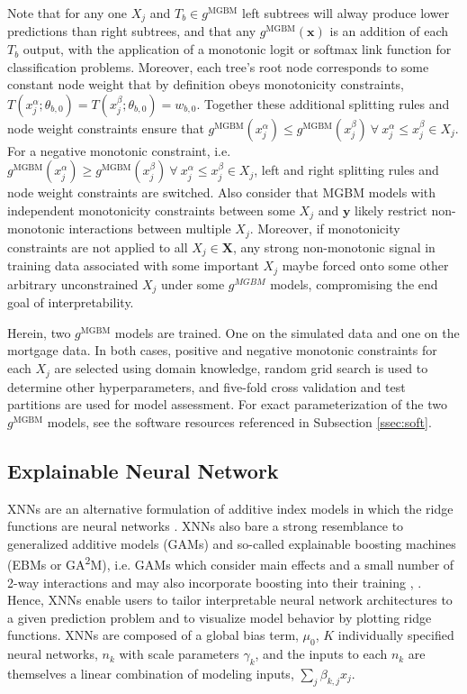 \documentclass[information,article,submit,moreauthors,pdftex]{definitions/mdpi}
\begin{document}
\noindent Note that for any one $X_j$ and $T_b \in g^{\text{MGBM}}$ left subtrees will alway produce lower predictions than right subtrees, and that any $g^{\text{MGBM}}(\mathbf{x})$ is an addition of each $T_b$ output, with the application of a monotonic logit or softmax link function for classification problems. Moreover, each tree's root node corresponds to some constant node weight that by definition obeys monotonicity constraints, $ T(x^{\alpha}_j; \theta_{b,0}) = T(x^{\beta}_j; \theta_{b,0}) = w_{b,0}$. Together these additional splitting rules and node weight constraints ensure that $g^{\text{MGBM}}(x^{\alpha}_j)  \le g^{\text{MGBM}}(x^{\beta}_j) ~\forall ~x^{\alpha}_j \le x^{\beta}_j \in X_j$. For a negative monotonic constraint, i.e. $g^{\text{MGBM}}(x^{\alpha}_j)  \ge g^{\text{MGBM}}(x^{\beta}_j) ~\forall ~x^{\alpha}_j \le x^{\beta}_j \in X_j$, left and right splitting rules and node weight constraints are switched. Also consider that MGBM models with independent monotonicity constraints between some $X_j$ and $\mathbf{y}$ likely restrict non-monotonic interactions between multiple $X_j$. Moreover, if monotonicity constraints are not applied to all $X_j \in \mathbf{X}$, any strong non-monotonic signal in training data associated with some important $X_j$ maybe forced onto some other arbitrary unconstrained $X_j$ under some $g^{MGBM}$ models, compromising the end goal of interpretability.

Herein, two $g^\text{MGBM}$ models are trained.  One on the simulated data and one on the mortgage data. In both cases, positive and negative monotonic constraints for each $X_j$ are selected using domain knowledge, random grid search is used to determine other hyperparameters, and five-fold cross validation and test partitions are used for model assessment. For exact parameterization of the two $g^\text{MGBM}$ models, see the software resources referenced in Subsection \ref{ssec:soft}. 


\subsection{Explainable Neural Network}\label{ssec:xnn}

XNNs are an alternative formulation of additive index models in which the ridge functions are neural networks \cite{wf_xnn}. XNNs also bare a strong resemblance to generalized additive models (GAMs) and so-called explainable boosting machines (EBMs or GA\textsuperscript{2}M), i.e. GAMs which consider main effects and a small number of 2-way interactions and may also incorporate boosting into their training \cite{esl}, \cite{ga2m}.  Hence, XNNs enable users to tailor interpretable neural network architectures to a given prediction problem and to visualize model behavior by plotting ridge functions. XNNs are composed of a global bias term, $\mu_0$, $K$ individually specified neural networks, $n_k$ with scale parameters $\gamma_k$, and the inputs to each $n_k$ are themselves a linear combination of modeling inputs, $\sum_j\beta_{k,j}x_j$.
\end{document}
